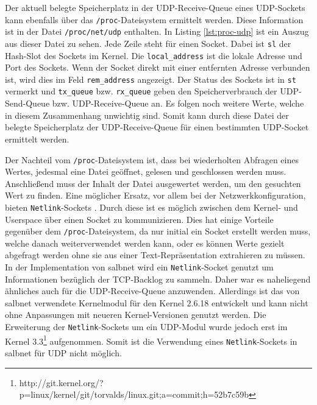 \documentclass[a4paper, 12pt, BCOR10mm, DIV12, toc=bibliography, toc=listof, german]{scrbook}
\begin{document}
		Der aktuell belegte Speicherplatz in der UDP-Receive-Queue eines UDP-Sockets kann ebenfalls über
		das \texttt{/proc}-Dateisystem ermittelt werden. Diese Information ist in der Datei
		\texttt{/proc/net/udp} enthalten. In Listing \ref{lst:proc-udp} ist ein Auszug aus dieser Datei
		zu sehen. Jede Zeile steht für einen Socket. Dabei ist \texttt{sl} der Hash-Slot des Sockets im
		Kernel. Die \texttt{local\_address} ist die lokale Adresse und Port des Sockets. Wenn der Socket
		direkt  mit einer entfernten Adresse verbunden ist, wird dies im Feld \texttt{rem\_address} angezeigt.
		Der Status des Sockets ist in \texttt{st} vermerkt und \texttt{tx\_queue} bzw.
		\texttt{rx\_queue} geben den Speicherverbrauch der UDP-Send-Queue bzw. UDP-Receive-Queue an. Es
		folgen noch weitere Werte, welche in diesem Zusammenhang unwichtig sind. Somit kann durch diese
		Datei der belegte Speicherplatz der UDP-Receive-Queue für einen bestimmten UDP-Socket ermittelt werden.

		Der Nachteil vom \texttt{/proc}-Dateisystem ist, dass bei wiederholten Abfragen eines Wertes,
		jedesmal eine Datei geöffnet, gelesen und geschlossen werden muss. Anschließend muss der Inhalt
		der Datei ausgewertet werden, um den gesuchten Wert zu finden. Eine möglicher Ersatz, vor allem
		bei der Netzwerkkonfiguration, bieten \texttt{Netlink}-Sockets \cite{rfc3549, gusowski2009}.
		Durch diese ist es möglich zwischen dem Kernel- und Userspace über einen Socket zu
		kommunizieren. Dies hat einige Vorteile gegenüber dem \texttt{/proc}-Dateisystem, da nur initial
		ein Socket erstellt werden muss, welche danach weiterverwendet werden kann, oder es können Werte
		gezielt abgefragt werden ohne sie aus einer Text-Repräsentation extrahieren zu müssen. In der
		Implementation von salbnet \cite{zinke2012} wird ein \texttt{Netlink}-Socket genutzt um
		Informationen bezüglich der TCP-Backlog zu sammeln. Daher war es naheliegend ähnliches auch für
		die UDP-Receive-Queue anzuwenden. Allerdings ist das von salbnet verwendete Kernelmodul für den
		Kernel 2.6.18 entwickelt und kann nicht ohne Anpassungen mit neueren Kernel-Versionen genutzt
		werden. Die Erweiterung der \texttt{Netlink}-Sockets um ein UDP-Modul wurde jedoch erst im
		Kernel
		3.3\footnote{http://git.kernel.org/?p=linux/kernel/git/torvalds/linux.git;a=commit;h=52b7c59b}
		aufgenommen. Somit ist die Verwendung eines \texttt{Netlink}-Sockets in salbnet für UDP nicht
		möglich.		

		
\end{document}
